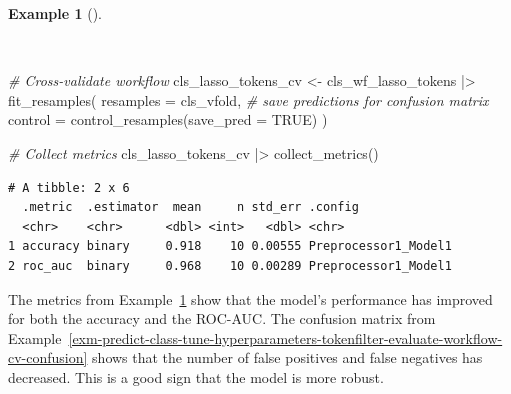 \documentclass[
  letterpaper,
]{book}
\newenvironment{Shaded}{\begin{snugshade}}{\end{snugshade}}
\newcommand{\AttributeTok}[1]{\textcolor[rgb]{0.00,0.00,0.00}{#1}}
\newcommand{\CommentTok}[1]{\textcolor[rgb]{0.00,0.00,0.00}{\textit{#1}}}
\newcommand{\ConstantTok}[1]{\textcolor[rgb]{0.00,0.00,0.00}{#1}}
\newcommand{\FunctionTok}[1]{\textcolor[rgb]{0.00,0.00,0.00}{#1}}
\newcommand{\NormalTok}[1]{\textcolor[rgb]{0.00,0.00,0.00}{#1}}
\newcommand{\OtherTok}[1]{\textcolor[rgb]{0.00,0.00,0.00}{#1}}
\newcommand{\SpecialCharTok}[1]{\textcolor[rgb]{0.00,0.00,0.00}{#1}}
\theoremstyle{definition}
\newtheorem{example}{Example}[chapter]
\theoremstyle{remark}
\begin{document}
\begin{example}[]\protect\hypertarget{exm-predict-class-tune-hyperparameters-tokenfilter-evaluate-workflow-cv-collect}{}\label{exm-predict-class-tune-hyperparameters-tokenfilter-evaluate-workflow-cv-collect}

~

\begin{Shaded}
\begin{Highlighting}[]
\CommentTok{\# Cross{-}validate workflow}
\NormalTok{cls\_lasso\_tokens\_cv }\OtherTok{\textless{}{-}}
\NormalTok{  cls\_wf\_lasso\_tokens }\SpecialCharTok{|\textgreater{}}
  \FunctionTok{fit\_resamples}\NormalTok{(}
    \AttributeTok{resamples =}\NormalTok{ cls\_vfold,}
    \CommentTok{\# save predictions for confusion matrix}
    \AttributeTok{control =} \FunctionTok{control\_resamples}\NormalTok{(}\AttributeTok{save\_pred =} \ConstantTok{TRUE}\NormalTok{)}
\NormalTok{  )}

\CommentTok{\# Collect metrics}
\NormalTok{cls\_lasso\_tokens\_cv }\SpecialCharTok{|\textgreater{}}
  \FunctionTok{collect\_metrics}\NormalTok{()}
\end{Highlighting}
\end{Shaded}

\begin{verbatim}
# A tibble: 2 x 6
  .metric  .estimator  mean     n std_err .config             
  <chr>    <chr>      <dbl> <int>   <dbl> <chr>               
1 accuracy binary     0.918    10 0.00555 Preprocessor1_Model1
2 roc_auc  binary     0.968    10 0.00289 Preprocessor1_Model1
\end{verbatim}

\end{example}

The metrics from
Example~\ref{exm-predict-class-tune-hyperparameters-tokenfilter-evaluate-workflow-cv-collect}
show that the model's performance has improved for both the accuracy and
the ROC-AUC. The confusion matrix from
Example~\ref{exm-predict-class-tune-hyperparameters-tokenfilter-evaluate-workflow-cv-confusion}
shows that the number of false positives and false negatives has
decreased. This is a good sign that the model is more robust.
\end{document}
